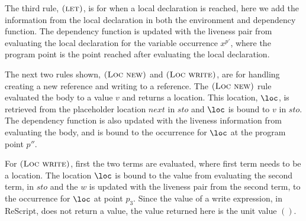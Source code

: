 \documentclass[../../master.tex]{subfiles}
\begin{document}
The third rule, $\textsc{(let)}$, is for when a local declaration is reached, here we add the information from the local declaration in both the environment and dependency function.
The dependency function is updated with the liveness pair from evaluating the local declaration for the variable occurrence $x^{p'}$, where the program point is the point reached after evaluating the local declaration.

The next two rules shown, $\textsc{(Loc new)}$ and $\textsc{(Loc write)}$, are for handling creating a new reference and writing to a reference.
The $\textsc{(Loc new)}$ rule evaluated the body to a value $v$ and returns a location.
This location, $\loc$, is retrieved from the placeholder location $next$ in $sto$ and $\loc$ is bound to $v$ in $sto$.
The dependency function is also updated with the liveness information from evaluating the body, and is bound to the occurrence for $\loc$ at the program point $p''$.

For $\textsc{(Loc write)}$, first the two terms are evaluated, where first term needs to be a location.
The location $\loc$ is bound to the value from evaluating the second term, in $sto$ and the $w$ is updated with the liveness pair from the second term, to the occurrence for $\loc$ at point $p_3$.
Since the value of a write expression, in ReScript, does not return a value, the value returned here is the unit value $()$.
\end{document}
